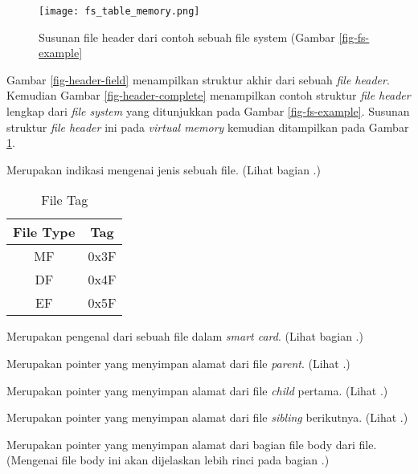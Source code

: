 \documentclass[a4paper, 12pt]{report}
\begin{document}
\begin{figure}
\centering
\texttt{[image: fs\_table\_memory.png]}
\caption{Susunan file header dari contoh sebuah file system (Gambar \ref{fig-fs-example}}
\label{fig-header-memory}
\end{figure}

Gambar \ref{fig-header-field} menampilkan struktur akhir dari sebuah {\em file header}. Kemudian Gambar \ref{fig-header-complete} menampilkan contoh struktur {\em file header} lengkap dari {\em file system} yang ditunjukkan pada Gambar \ref{fig-fs-example}. Susunan struktur {\em file header} ini pada {\em virtual memory} kemudian ditampilkan pada Gambar \ref{fig-header-memory}.


\begin{description}[leftmargin=2.5cm,style=sameline]

\item[Tag] Merupakan indikasi mengenai jenis sebuah file. (Lihat bagian .)

\begin{table}[htbp]
  \centering
  \begin{tabular}{|c|c|}
    \hline
    File Type & Tag\\[5pt]
    \hline
    MF        & 0x3F\\
    DF        & 0x4F\\
    EF        & 0x5F\\
    \hline
  \end{tabular}
  \caption{File Tag}
  \label{"tbl-file-tag}
\end{table}


\item[FID] Merupakan pengenal dari sebuah file dalam \textsl{smart card}. (Lihat bagian .)

\item[Parent] Merupakan pointer yang menyimpan alamat dari file {\em parent}. (Lihat .)

\item[Child] Merupakan pointer yang menyimpan alamat dari file {\em child} pertama. (Lihat .)

\item[Sibling] Merupakan pointer yang menyimpan alamat dari file {\em sibling} berikutnya. (Lihat .)

\item[File Body] Merupakan pointer yang menyimpan alamat dari bagian file body dari file. (Mengenai file body ini akan dijelaskan lebih rinci pada bagian .)

\end{description}
\end{document}
